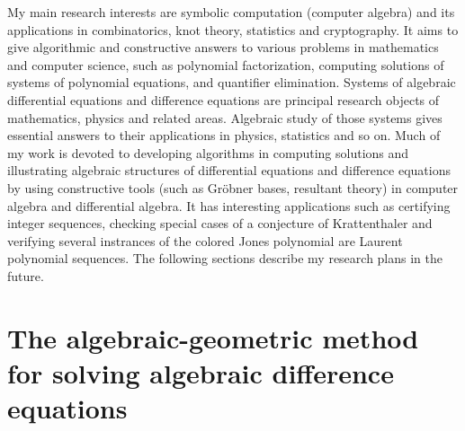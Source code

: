 \documentclass[10pt,a4paper]{article}
\begin{document}
My main research interests are symbolic computation (computer algebra) and its applications in combinatorics, knot theory, statistics 
and cryptography.  It aims to give algorithmic and constructive answers 
to various problems in mathematics and computer science, such as polynomial factorization, computing solutions of systems of polynomial equations, 
and quantifier elimination. Systems of algebraic differential equations and difference equations are principal research objects of mathematics, physics and related areas. 
Algebraic study of those systems gives essential answers to their applications in physics, statistics and so on. 
Much of my work is devoted to developing algorithms in  computing solutions and illustrating algebraic structures of differential equations and difference equations
by using constructive tools (such as Gr\"obner bases, resultant theory) in computer algebra and differential algebra. 
It has interesting applications such as certifying integer sequences, checking special cases of a conjecture of Krattenthaler and verifying 
several instrances of the colored Jones polynomial are Laurent polynomial sequences.  
The following sections describe my research plans in the future. 

\section*{The algebraic-geometric method for solving algebraic difference equations} \label{SECT:AODE}
\end{document}
